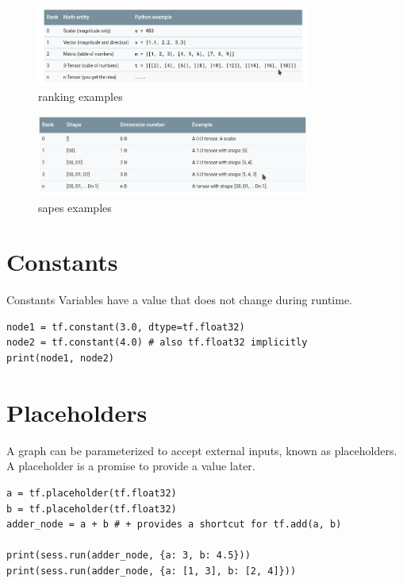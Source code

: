 \documentclass[11pt,openany]{book}
\begin{document}
\begin{figure}[h]
    \centering
    \includegraphics[width=0.8\textwidth]{img/rank.png}
    \caption{ranking examples}
    \label{fig:const_add}
\end{figure}

\begin{figure}[h]
    \centering
    \includegraphics[width=0.8\textwidth]{img/shape.png}
    \caption{sapes examples}
    \label{fig:const_add}
\end{figure}


\section{Constants}

Constants Variables have a value that does not change during runtime.

\begin{verbatim}
node1 = tf.constant(3.0, dtype=tf.float32)
node2 = tf.constant(4.0) # also tf.float32 implicitly
print(node1, node2)
\end{verbatim}

\section{Placeholders}

A graph can be parameterized to accept external inputs, known as placeholders. A placeholder is a promise to provide a value later.

\begin{verbatim}
a = tf.placeholder(tf.float32)
b = tf.placeholder(tf.float32)
adder_node = a + b # + provides a shortcut for tf.add(a, b)

print(sess.run(adder_node, {a: 3, b: 4.5}))
print(sess.run(adder_node, {a: [1, 3], b: [2, 4]}))
\end{verbatim}
\end{document}
